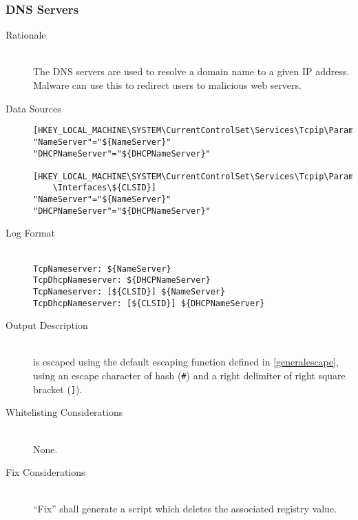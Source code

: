 \subsubsection{DNS Servers}
\begin{description}
\item[Rationale] \hfill \\
The DNS servers are used to resolve a domain name to a given IP address. Malware
can use this to redirect users to malicious web servers.
\item[Data Sources] \hfill
\vspace{-\baselineskip}
\begin{verbatim}
[HKEY_LOCAL_MACHINE\SYSTEM\CurrentControlSet\Services\Tcpip\Parameters]
"NameServer"="${NameServer}"
"DHCPNameServer"="${DHCPNameServer}"

[HKEY_LOCAL_MACHINE\SYSTEM\CurrentControlSet\Services\Tcpip\Parameters
    \Interfaces\${CLSID}]
"NameServer"="${NameServer}"
"DHCPNameServer"="${DHCPNameServer}"
\end{verbatim}
\item[Log Format] \hfill \\
\verb|TcpNameserver: ${NameServer}| \\
\verb|TcpDhcpNameserver: ${DHCPNameServer}| \\
\verb|TcpNameserver: [${CLSID}] ${NameServer}| \\
\verb|TcpDhcpNameserver: [${CLSID}] ${DHCPNameServer}| \\
\item[Output Description] \hfill \\
 is escaped using the default escaping function defined in
\ref{generalescape}, using an escape character of hash (\verb|#|) and a right
delimiter of right square bracket (\verb|]|).
\item[Whitelisting Considerations] \hfill \\
None.
\item[Fix Considerations] \hfill \\
``Fix'' shall generate a script which deletes the associated registry value.
\end{description}

